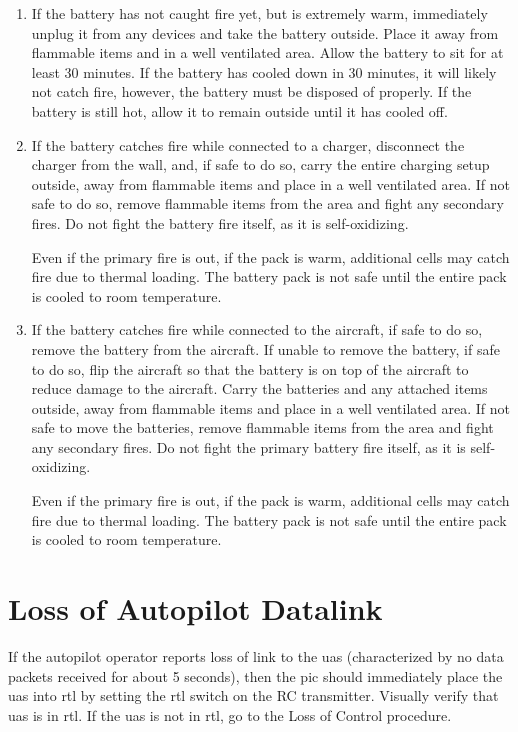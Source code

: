 \documentclass{report}
\begin{document}
		\begin{enumerate}
			\item If the battery has not caught fire yet, but is extremely warm, immediately unplug it from any devices and take the battery outside.  Place it away from flammable items and in a well ventilated area. Allow the battery to sit for at least 30 minutes.  If the battery has cooled down in 30 minutes, it will likely not catch fire, however, the battery must be disposed of properly.  If the battery is still hot, allow it to remain outside until it has cooled off.
			\item If the battery catches fire while connected to a charger, disconnect the charger from the wall, and, if safe to do so, carry the entire charging setup outside, away from flammable items and place in a well ventilated area. If not safe to do so, remove flammable items from the area and fight any secondary fires.  Do not fight the battery fire itself, as it is self-oxidizing.

			Even if the primary fire is out, if the pack is warm, additional cells may catch fire due to thermal loading.  The battery pack is not safe until the entire pack is cooled to room temperature.
			\item If the battery catches fire while connected to the aircraft, if safe to do so, remove the battery from the aircraft.  If unable to remove the battery, if safe to do so, flip the aircraft so that the battery is on top of the aircraft to reduce damage to the aircraft.  Carry the batteries and any attached items outside, away from flammable items and place in a well ventilated area.  If not safe to move the batteries, remove flammable items from the area and fight any secondary fires.  Do not fight the primary battery fire itself, as it is self-oxidizing.

			Even if the primary fire is out, if the pack is warm, additional cells may catch fire due to thermal loading.  The battery pack is not safe until the entire pack is cooled to room temperature.
		\end{enumerate}
	\section{Loss of Autopilot Datalink}
		If the autopilot operator reports loss of link to the \gls{uas} (characterized by no data packets received for about 5 seconds), then the \gls{pic} should immediately place the \gls{uas} into \gls{rtl} by setting the \gls{rtl} switch on the RC transmitter.  Visually verify that \gls{uas} is in \gls{rtl}.  If the \gls{uas} is not in \gls{rtl}, go to the Loss of Control procedure.
\end{document}
